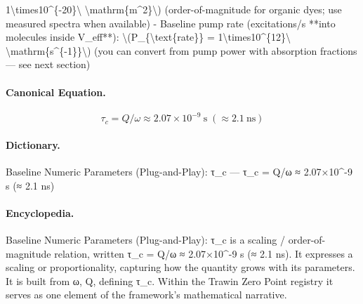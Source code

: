 1\textbackslash{}times10\textasciicircum{}\{-20\}\textbackslash{} \textbackslash{}mathrm\{m\textasciicircum{}2\}\textbackslash{}) (order-of-magnitude for organic dyes; use measured spectra when available) - Baseline pump rate (excitations/s **into molecules inside V\_eff**): \textbackslash{}(P\_\{\textbackslash{}text\{rate\}\} = 1\textbackslash{}times10\textasciicircum{}\{12\}\textbackslash{} \textbackslash{}mathrm\{s\textasciicircum{}\{-1\}\}\textbackslash{}) (you can convert from pump power with absorption fractions — see next section)

\paragraph{Canonical Equation.}
\[
\tau_c = Q/\omega \approx 2.07\times10^{-9}\ \mathrm{s} \;(\approx 2.1\ \text{ns})
\]

\paragraph{Dictionary.}
Baseline Numeric Parameters (Plug-and-Play): τ\_c — τ\_c = Q/ω ≈ 2.07×10\textasciicircum{}-9 s (≈ 2.1 ns)

\paragraph{Encyclopedia.}
Baseline Numeric Parameters (Plug-and-Play): τ\_c is a scaling / order-of-magnitude relation, written τ\_c = Q/ω ≈ 2.07×10\textasciicircum{}-9 s (≈ 2.1 ns). It expresses a scaling or proportionality, capturing how the quantity grows with its parameters. It is built from ω, Q, defining τ\_c. Within the Trawin Zero Point registry it serves as one element of the framework's mathematical narrative.
